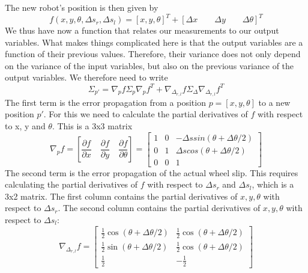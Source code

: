 The new robot's position is then given by
\begin{equation}
f(x,y,\theta,\Delta s_r, \Delta s_l)=[x,y,\theta]^T + [\Delta x \qquad \Delta y \qquad \Delta \theta]^T
\end{equation}
We thus have now a function that relates our measurements to our output variables. What makes things complicated here is that the output variables are a function of their previous values. Therefore, their variance does not only depend on the variance of the input variables, but also on the previous variance of the output variables. We therefore need to write
\begin{equation}\label{eq:errorpropodom}
\Sigma_{p'}=\nabla_p f \Sigma_p \nabla_p f^T + \nabla_{\Delta_{r,l}}f \Sigma_{\Delta}\nabla_{\Delta_{r,l}}f^T
\end{equation}
The first term is the error propagation from a position $ p=[x,y,\theta]$ to a new position $ p'$. For this we need to calculate the partial derivatives of $ f$ with respect to x, y and $ \theta$. This is a 3x3 matrix
\begin{equation}
\nabla_p f=\left[\frac{\partial f}{\partial x} \quad \frac{\partial f}{\partial y} \quad \frac{\partial f}{\partial \theta}\right]=\left[\begin{array}{ccc}1 & 0 & -\Delta s sin(\theta +\Delta \theta /2)\\0 & 1 & \Delta s cos(\theta + \Delta \theta/2)\\0 & 0 &1\end{array}\right]
\end{equation}
The second term is the error propagation of the actual wheel slip. This requires calculating the partial derivatives of $ f$ with respect to $ \Delta s_r$ and $ \Delta s_l$, which is a 3x2 matrix. The first column contains the partial derivatives of $ x,y,\theta$ with respect to $ \Delta s_r$. The second column contains the partial derivatives of $ x,y,\theta$ with respect to $ \Delta s_l$:
\begin{equation}
\nabla_{\Delta_{r,l}} f=\left[
\begin{array}{cc}
\frac{1}{2}\cos(\theta+\Delta \theta/2) & \frac{1}{2}\cos(\theta+\Delta \theta/2)\\
\frac{1}{2}\sin(\theta+\Delta \theta/2) & \frac{1}{2}\cos(\theta+\Delta \theta/2)\\
\frac{1}{2} & -\frac{1}{2}
\end{array}
\right]
\end{equation}

